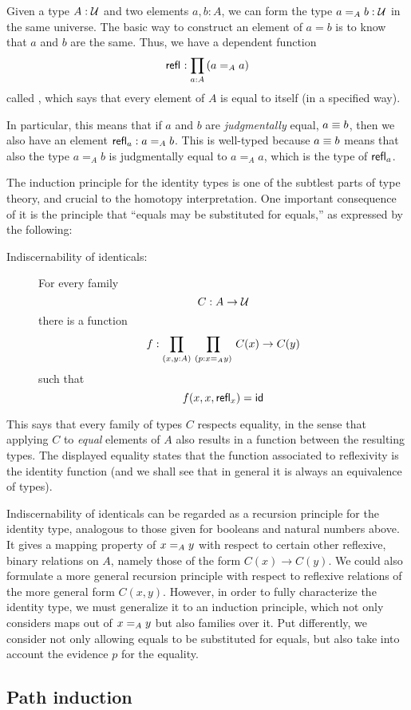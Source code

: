 Given a type $A:\UU$ and two elements $a,b:A$, we can form the type $a=_A b:\UU$ in the same universe.
The basic way to construct an element of $a=b$ is to know that $a$ and $b$ are the same.
Thus, we have a dependent function
\[\refl{} : \prd{a:A} (a =_A a)\]
called , which says that every element of $A$ is equal to itself (in a specified way).

In particular, this means that if $a$ and $b$ are \emph{judgmentally} equal, $a\jdeq b$, then we also have an element $\refl{a} : a=_A b$.
This is well-typed because $a\jdeq b$ means that also the type $a=_A b$ is judgmentally equal to $a=_A a$, which is the type of $\refl{a}$.

The induction principle for the identity types is one of the subtlest parts of type theory, and crucial to the homotopy interpretation.
One important consequence of it is the principle that ``equals may be substituted for equals,'' as expressed by the following:
\begin{description}
\item[Indiscernability of identicals:]
For every family 
\[
C : A \to \UU
\]
there is a function
\[
f : \prd{x,y:A}{p:\id[A] x y} C(x) \to C(y)
\]
such that
\[
f(x,x,\refl{x}) = \idfunc
\]
\end{description}
This says that every family of types $C$ respects equality, in the sense that applying $C$ to \emph{equal} elements of $A$ also results in a function between the resulting types. The displayed equality states that the function associated to reflexivity is the identity function (and we shall see that in general it is always an equivalence of types).

Indiscernability of identicals can be regarded as a recursion principle for the identity type, analogous to those given for booleans and natural numbers above.  It gives a mapping property of $\id[A] x y$ with respect to certain other reflexive, binary relations on $A$, namely those of the form $C(x) \to C(y)$.  We could also formulate a more general recursion principle with respect to reflexive relations of the more general form $C(x,y)$.  However, 
in order to fully characterize the identity type, we must generalize it to an induction principle, which not only considers maps out of $\id[A] x y$ but also families over it.   Put differently, we consider not only allowing equals to be substituted for equals, but also take into account the evidence $p$ for the equality.  
    
\subsection{Path induction}

